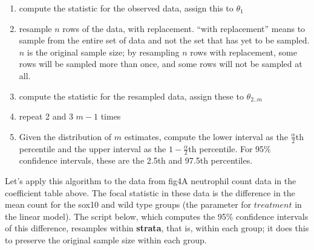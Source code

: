 \documentclass[]{book}
\providecommand{\tightlist}{%
  \setlength{\itemsep}{0pt}\setlength{\parskip}{0pt}}
\begin{document}
\begin{enumerate}
\def\labelenumi{\arabic{enumi}.}
\tightlist
\item
  compute the statistic for the observed data, assign this to \(\theta_1\)
\item
  resample \(n\) rows of the data, with replacement. ``with replacement'' means to sample from the entire set of data and not the set that has yet to be sampled. \(n\) is the original sample size; by resampling \(n\) rows with replacement, some rows will be sampled more than once, and some rows will not be sampled at all.
\item
  compute the statistic for the resampled data, assign these to \(\theta_{2..m}\)
\item
  repeat 2 and 3 \(m-1\) times
\item
  Given the distribution of \(m\) estimates, compute the lower interval as the \(\frac{\alpha}{2}\)th percentile and the upper interval as the \(1 - \frac{\alpha}{2}\)th percentile. For 95\% confidence intervals, these are the 2.5th and 97.5th percentiles.
\end{enumerate}

Let's apply this algorithm to the data from fig4A neutrophil count data in the coefficient table above. The focal statistic in these data is the difference in the mean count for the sox10 and wild type groups (the parameter for \(treatment\) in the linear model). The script below, which computes the 95\% confidence intervals of this difference, resamples within \textbf{strata}, that is, within each group; it does this to preserve the original sample size within each group.
\end{document}
